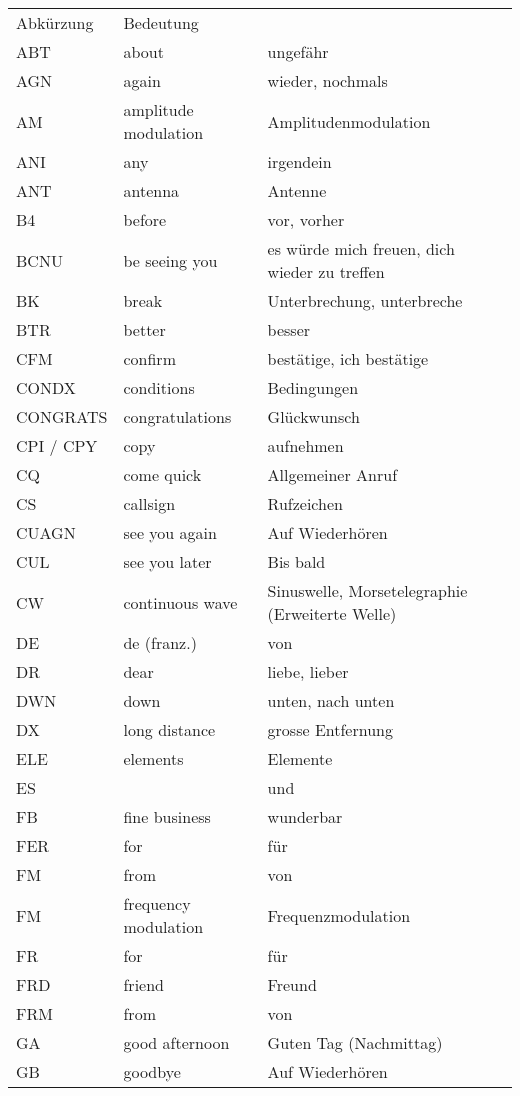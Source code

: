 \begin{tabular}{lll}
 Abkürzung & Bedeutung &  \\
ABT & about & ungefähr \\
AGN & again & wieder, nochmals \\
AM & amplitude modulation & Amplitudenmodulation \\
ANI & any & irgendein \\
ANT & antenna & Antenne \\
B4 & before & vor, vorher \\
BCNU & be seeing you & es würde mich freuen, dich  wieder zu treffen \\
BK & break & Unterbrechung, unterbreche \\
BTR & better & besser \\
CFM & confirm & bestätige, ich bestätige \\
CONDX & conditions & Bedingungen \\
CONGRATS & congratulations & Glückwunsch \\
CPI / CPY & copy & aufnehmen \\
CQ & come quick & Allgemeiner Anruf \\
CS & callsign & Rufzeichen \\
CUAGN & see you again & Auf Wiederhören \\
CUL & see you later & Bis bald \\
CW & continuous wave & Sinuswelle, Morsetelegraphie  (Erweiterte Welle) \\
DE & de (franz.) & von \\
DR & dear & liebe, lieber \\
DWN & down & unten, nach unten \\
DX & long distance & grosse Entfernung \\
ELE & elements & Elemente \\
ES &  & und \\
FB & fine business & wunderbar \\
FER & for & für \\
FM & from & von \\
FM & frequency modulation & Frequenzmodulation \\
FR & for & für \\
FRD & friend & Freund \\
FRM & from & von \\
GA & good afternoon & Guten Tag (Nachmittag) \\
GB & goodbye & Auf Wiederhören \\

\end{tabular}
